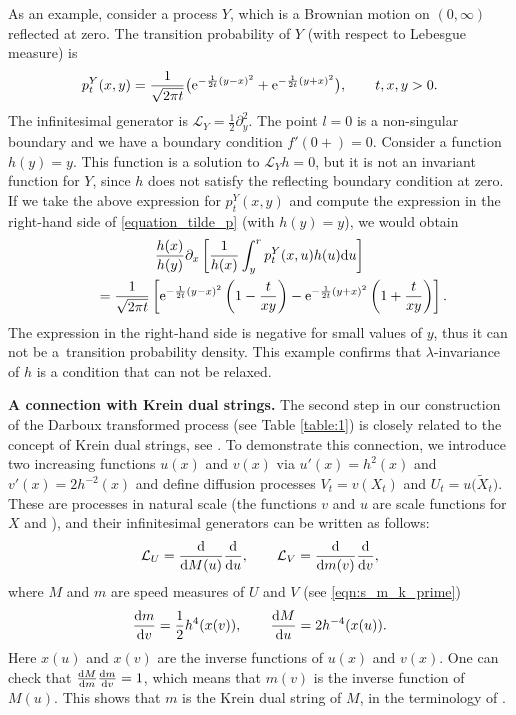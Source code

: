 \documentclass[pdftex]{sigma}
\numberwithin{equation}{section}
\theoremstyle{definition}
\def\L{{\mathcal L}}
\def\d{{\textnormal d}}
\begin{document}
 As an example, consider a process $Y$, which is a Brownian motion on $(0,\infty)$ reflected at zero. The transition probability of $Y$ (with respect to Lebesgue measure) is
\[
p_t^Y(x,y)=\frac{1}{\sqrt{2\pi t}} \bigl({\rm e}^{-\frac{1}{2t}(y-x)^2}+{\rm e}^{-\frac{1}{2t}(y+x)^2}\bigr), \qquad t,x,y>0.
\]
The infinitesimal generator is $\L_Y=\frac{1}{2} \partial_y^2$. The point $l=0$ is a non-singular boundary and we have a boundary condition $f'(0+)=0$. Consider a function $h(y)=y$. This function is a solution to $\L_Y h = 0$, but it is not an invariant function for $Y$, since $h$ does not satisfy the reflecting boundary condition at zero. If we take the above expression for $p^Y_t(x,y)$ and compute the expression in the right-hand side of \eqref{equation_tilde_p} (with $h(y)=y$), we would obtain
\begin{gather*}
\frac{h(x)}{h(y)} \partial_{x}
\left[ \frac{1}{h(x)} \int_{y}^r p^{Y}_t(x,u) h(u) \d u \right]\\
\qquad= \frac{1}{\sqrt{2\pi t}}
\left[{\rm e}^{-\frac{1}{2t}(y-x)^2}\left(1-\frac{t}{xy}\right)-{\rm e}^{-\frac{1}{2t}(y+x)^2}\left(1+\frac{t}{xy}\right)\right].
\end{gather*}
The expression in the right-hand side is negative for small values of $y$, thus it can not be a~transition probability density. This example confirms that $\lambda$-invariance of $h$ is a condition that can not be relaxed.

{\bf A connection with Krein dual strings.}
The second step in our construction of the Darboux transformed process (see Table \ref{table:1}) is closely related to the concept of Krein dual strings, see \cite{Comtet_2011,Kotani_1982}. To demonstrate this connection, we introduce two increasing functions $u(x)$ and $v(x)$ via
$u'(x)=h^2(x)$ and $v'(x)=2 h^{-2}(x)$
and define diffusion processes $V_t=v(X_t)$ and $U_t=u\bigl(\widetilde X_t\bigr)$. These are processes in natural scale (the functions $v$ and $u$ are scale functions for $X$ and ), and their infinitesimal generators can be written as follows:
\[
\L_U=\frac{\d}{\d M(u)} \frac{\d}{\d u}, \qquad \L_V=\frac{\d}{\d m(v)} \frac{\d}{\d v},
\]
where $M$ and $m$ are speed measures of $U$ and $V$ (see \eqref{eqn:s_m_k_prime})
\[
\frac{\d m}{\d v}=\frac{1}{2} h^{4}(x(v)), \qquad
\frac{\d M}{\d u}=2 h^{-4}(x(u)).
\]
Here $x(u)$ and $x(v)$ are the inverse functions of $u(x)$ and $v(x)$. One can check that
$
\frac{\d M}{\d m} \frac{\d m}{\d v}=1$,
which means that $m(v)$ is the inverse function of $M(u)$. This shows that $m$ is the Krein dual string of $M$, in the terminology of \cite{Comtet_2011,Kotani_1982}.
\end{document}
